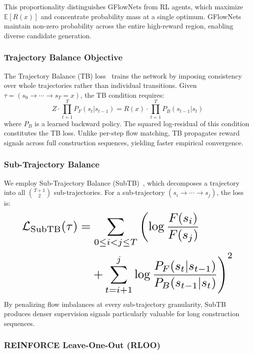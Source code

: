 \documentclass[twocolumn,10pt]{article}
\begin{document}
This proportionality distinguishes GFlowNets from RL agents, which maximize $\mathbb{E}[R(x)]$ and concentrate probability mass at a single optimum. GFlowNets maintain non-zero probability across the entire high-reward region, enabling diverse candidate generation.

\subsubsection{Trajectory Balance Objective}

The Trajectory Balance (TB) loss~\cite{malkin2022trajectory} trains the network by imposing consistency over whole trajectories rather than individual transitions. Given $\tau = (s_0 \to \cdots \to s_T = x)$, the TB condition requires:
\begin{equation}
Z \cdot \prod_{t=1}^{T} P_F(s_t | s_{t-1}) = R(x) \cdot \prod_{t=1}^{T} P_B(s_{t-1} | s_t)
\label{eq:tb_condition}
\end{equation}
where $P_B$ is a learned backward policy. The squared log-residual of this condition constitutes the TB loss. Unlike per-step flow matching, TB propagates reward signals across full construction sequences, yielding faster empirical convergence.

\subsubsection{Sub-Trajectory Balance}

We employ Sub-Trajectory Balance (SubTB)~\cite{madan2023learning}, which decomposes a trajectory into all $\binom{T+1}{2}$ sub-trajectories. For a sub-trajectory $(s_i \to \cdots \to s_j)$, the loss is:
\begin{equation}
\resizebox{0.89\linewidth}{!}{$
\begin{aligned}
\mathcal{L}_\text{SubTB}(\tau) &= \sum_{0 \leq i < j \leq T} \left( \log \frac{F(s_i)}{F(s_j)} \right. \\
&\quad \left. + \sum_{t=i+1}^{j} \log \frac{P_F(s_t | s_{t-1})}{P_B(s_{t-1} | s_t)} \right)^2
\end{aligned}
$}
\label{eq:subtb}
\end{equation}
By penalizing flow imbalances at every sub-trajectory granularity, SubTB produces denser supervision signals particularly valuable for long construction sequences.

\subsubsection{REINFORCE Leave-One-Out (RLOO)}
\end{document}
